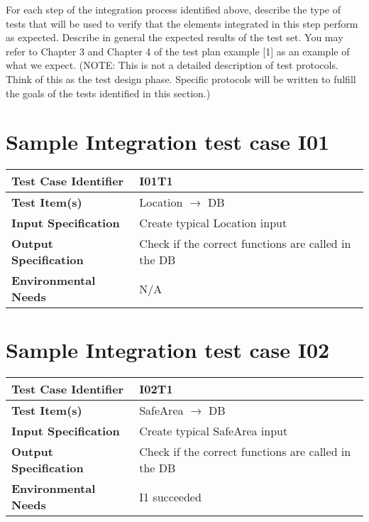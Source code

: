 For each step of the integration process identified above, describe the type of tests that will be used to verify that the elements integrated in this step perform as expected. Describe in general the expected results of the test set. You may refer to Chapter 3 and Chapter 4 of the test plan example [1] as an example of what we expect.
(NOTE: This is not a detailed description of test protocols. Think of this as the test design phase. Specific protocols will be written to fulfill the goals of the tests identified in this section.)

\section{Sample Integration test case I01}\label{I01}
\begin{center}
	\vspace{0.6cm}
	\begin{tabular}{|l|l|}
		\hline
		\textbf{Test Case Identifier} & I01T1 \bigstrut \\\hline
		\textbf{Test Item(s)} & Location \ensuremath{\rightarrow} DB \bigstrut \\\hline
		\textbf{Input Specification} & Create typical Location input \bigstrut \\\hline
		\textbf{Output Specification} & Check if the correct functions are called in the DB \bigstrut \\\hline
		\textbf{Environmental Needs} & N/A \bigstrut \\\hline
	\end{tabular}
\end{center}

\section{Sample Integration test case I02}\label{I02}
\begin{center}
	\vspace{0.6cm}
	\begin{tabular}{|l|l|}
		\hline
		\textbf{Test Case Identifier} & I02T1 \bigstrut \\\hline
		\textbf{Test Item(s)} & SafeArea \ensuremath{\rightarrow} DB \bigstrut \\\hline
		\textbf{Input Specification} & Create typical SafeArea input \bigstrut \\\hline
		\textbf{Output Specification} & Check if the correct functions are called in the DB \bigstrut \\\hline
		\textbf{Environmental Needs} & I1 succeeded\bigstrut \\\hline
	\end{tabular}
\end{center}


